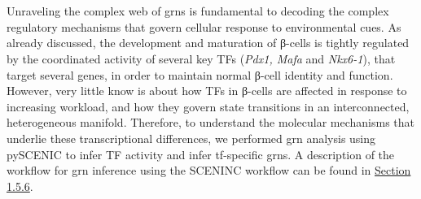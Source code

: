 \section{}
\label{sec:chp3_betaGRN}
Unraveling the complex web of \glspl{grn} is fundamental to decoding the complex regulatory mechanisms that govern cellular response to environmental cues. As already discussed, the development and maturation of β-cells is tightly regulated by the coordinated activity of several key TFs (\textit{Pdx1, Mafa} and \textit{Nkx6-1}), that target several genes, in order to maintain normal β-cell identity and function. However, very little know is about how TFs in β-cells are affected in response to increasing workload, and how they govern state transitions in an interconnected, heterogeneous manifold. Therefore, to understand the molecular mechanisms that underlie these transcriptional differences, we performed \gls{grn} analysis using pySCENIC to infer TF activity and infer \gls{tf}-specific \glspl{grn}. A description of the workflow for \gls{grn} inference using the SCENINC workflow can be found in \hyperref[sec:scrna_analysis_grn]{Section 1.5.6}.\\


